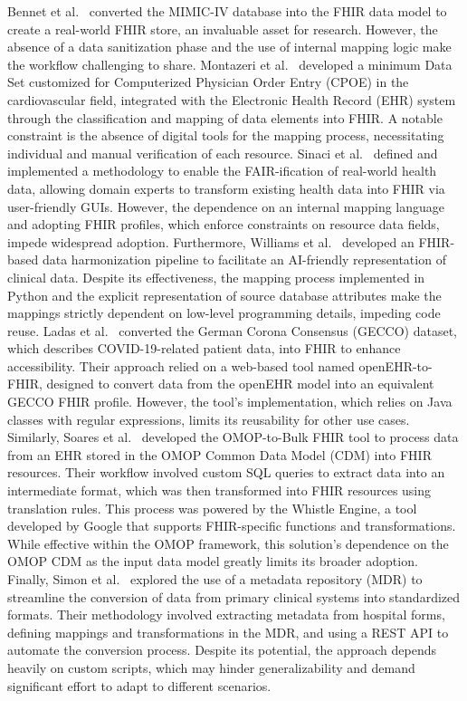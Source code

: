 Bennet et al.~\cite{bennett2023mimic} converted the MIMIC-IV database into the FHIR data model to create a real-world FHIR store, an invaluable asset for research. However, the absence of a data sanitization phase and the use of internal mapping logic make the workflow challenging to share. Montazeri et al.~\cite{montazeri2023developing} developed a minimum Data Set customized for Computerized Physician Order Entry (CPOE) in the cardiovascular field, integrated with the Electronic Health Record (EHR) system through the classification and mapping of data elements into FHIR. A notable constraint is the absence of digital tools for the mapping process, necessitating individual and manual verification of each resource. Sinaci et al.~\cite{sinaci2023data} defined and implemented a methodology to enable the FAIR-ification of real-world health data, allowing domain experts to transform existing health data into FHIR via user-friendly GUIs. However, the dependence on an internal mapping language and adopting FHIR profiles, which enforce constraints on resource data fields, impede widespread adoption. Furthermore, Williams et al.~\cite{williams2023standardized} developed an FHIR-based data harmonization pipeline to facilitate an AI-friendly representation of clinical data. Despite its effectiveness, the mapping process implemented in Python and the explicit representation of source database attributes make the mappings strictly dependent on low-level programming details, impeding code reuse. 
Ladas et al.~\cite{ladas2022openehr} converted the German Corona Consensus (GECCO) dataset, which describes COVID-19-related patient data, into FHIR to enhance accessibility. Their approach relied on a web-based tool named openEHR-to-FHIR, designed to convert data from the openEHR model into an equivalent GECCO FHIR profile. However, the tool's implementation, which relies on Java classes with regular expressions, limits its reusability for other use cases.
Similarly, Soares et al.~\cite{soares2023omop} developed the OMOP-to-Bulk FHIR tool to process data from an EHR stored in the OMOP Common Data Model (CDM) into FHIR resources. Their workflow involved custom SQL queries to extract data into an intermediate format, which was then transformed into FHIR resources using translation rules. This process was powered by the Whistle Engine, a tool developed by Google that supports FHIR-specific functions and transformations. While effective within the OMOP framework, this solution's dependence on the OMOP CDM as the input data model greatly limits its broader adoption.
Finally, Simon et al.~\cite{simon2024metadata} explored the use of a metadata repository (MDR) to streamline the conversion of data from primary clinical systems into standardized formats. Their methodology involved extracting metadata from hospital forms, defining mappings and transformations in the MDR, and using a REST API to automate the conversion process. Despite its potential, the approach depends heavily on custom scripts, which may hinder generalizability and demand significant effort to adapt to different scenarios.


